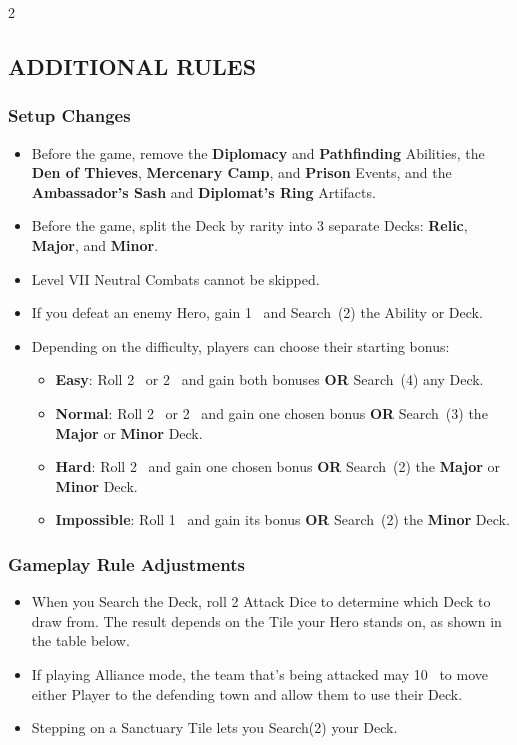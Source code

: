 \begin{multicols}{2}
\subsection*{\MakeUppercase{Additional Rules}}

\subsubsection*{Setup Changes}

\begin{itemize}
  \item Before the game, remove the \textbf{Diplomacy} and \textbf{Pathfinding} Abilities, the \textbf{Den of Thieves}, \textbf{Mercenary Camp}, and \textbf{Prison} Events, and the \textbf{Ambassador's Sash} and \textbf{Diplomat's Ring} Artifacts.
  \item Before the game, split the  Deck by rarity into 3 separate Decks: \textbf{Relic}, \textbf{Major}, and \textbf{Minor}.
  \item Level VII Neutral Combats cannot be skipped.
  \item If you defeat an enemy Hero, gain 1~ and Search~(2) the Ability or  Deck.
  \item Depending on the difficulty, players can choose their starting bonus:
  \begin{itemize}
    \item \textbf{Easy}: Roll 2~ or 2~ and gain both bonuses \textbf{OR} Search~(4) any  Deck.
    \item \textbf{Normal}: Roll 2~ or 2~ and gain one chosen bonus \textbf{OR} Search~(3) the \textbf{Major} or \textbf{Minor}  Deck.
    \item \textbf{Hard}: Roll 2~ and gain one chosen bonus \textbf{OR} Search~(2) the \textbf{Major} or \textbf{Minor}  Deck.
    \item \textbf{Impossible}: Roll 1~ and gain its bonus \textbf{OR} Search~(2) the \textbf{Minor}  Deck.
  \end{itemize}
\end{itemize}

\subsubsection*{Gameplay Rule Adjustments}

\begin{itemize}
  \item When you Search the  Deck, roll 2 Attack Dice to determine which  Deck to draw from.
    The result depends on the Tile your Hero stands on, as shown in the table below.
  \item If playing Alliance mode, the team that's being attacked may  10~ to move either Player to the defending town and allow them to use their Deck.
  \item Stepping on a Sanctuary Tile lets you Search(2) your Deck.
\end{itemize}


\end{multicols}
